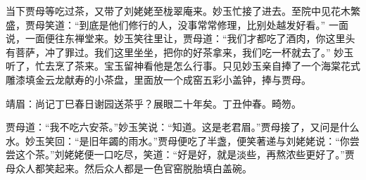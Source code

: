 \begin{parag}
    当下贾母等吃过茶，又带了刘姥姥至栊翠庵来。妙玉忙接了进去。至院中见花木繁盛，贾母笑道：“到底是他们修行的人，没事常常修理，比别处越发好看。” 一面说，一面便往东禅堂来。妙玉笑往里让，贾母道：“我们才都吃了酒肉，你这里头有菩萨，冲了罪过。我们这里坐坐，把你的好茶拿来，我们吃一杯就去了。” 妙玉听了，忙去烹了茶来。宝玉留神看他是怎么行事。只见妙玉亲自捧了一个海棠花式雕漆填金云龙献寿的小茶盘，里面放一个成窑五彩小盖钟，捧与贾母。\begin{note}靖眉：尚记丁巳春日谢园送茶乎？展眼二十年矣。丁丑仲春。畸笏。\end{note}贾母道：“我不吃六安茶。”妙玉笑说：“知道。这是老君眉。”贾母接了，又问是什么水。妙玉笑回：“是旧年蠲的雨水。”贾母便吃了半盏，便笑著递与刘姥姥说：“你尝尝这个茶。”刘姥姥便一口吃尽，笑道：“好是好，就是淡些，再熬浓些更好了。”贾母众人都笑起来。然后众人都是一色官窑脱胎填白盖碗。
\end{parag}


